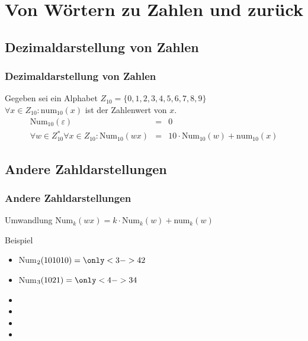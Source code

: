 \section{Von Wörtern zu Zahlen und zurück}
\subsection{Dezimaldarstellung von Zahlen}
\begin{frame}
	\frametitle{Dezimaldarstellung von Zahlen}
	\begin{definition}
		Gegeben sei ein Alphabet $Z_{10}=\{0,1,2,3,4,5,6,7,8,9\}$\\
		\vspace{.5cm}
		$\forall x\in Z_{10}:\text{num}_{10}(x)$ ist der Zahlenwert von $x$.
		\pause
		\begin{eqnarray*}
			\text{Num}_{10}(\varepsilon)&=&0\\
			\forall w\in Z_{10}^* \forall x\in Z_{10}: \text{Num}_{10}(wx)&=&10\cdot \text{Num}_{10}(w)+\text{num}_{10}(x)
		\end{eqnarray*}
	\end{definition}
\end{frame}

\subsection{Andere Zahldarstellungen}
\begin{frame}
	\frametitle{Andere Zahldarstellungen}
	\begin{block}{Umwandlung}
		Num$_k(wx)=k\cdot$Num$_k(w)+$num$_k(w)$
	\end{block}
	\pause
	\begin{exampleblock}{Beispiel}
		\begin{itemize}
			\item Num$_2(101010)=\only<3->{42}$
			\item Num$_3(1021)=\only<4->{34}$
			\item {}
			\item {}
			\item {}
			\item {}
		\end{itemize}

	\end{exampleblock}
\end{frame}

